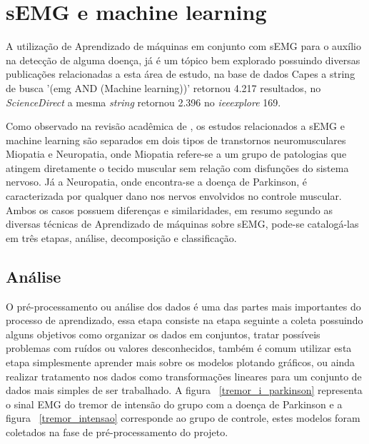 \section{sEMG e machine learning}
A utilização de Aprendizado de máquinas em conjunto com sEMG para o auxílio na detecção de alguma doença, já é um tópico bem explorado possuindo diversas publicações relacionadas a esta área de estudo, na base de dados Capes a string de busca '(emg AND (Machine learning))' retornou 4.217 resultados, no \textit{ScienceDirect} a mesma \textit{string} retornou 2.396 no \textit{ieeexplore} 169.

Como observado na revisão acadêmica de \cite{yousefi2014characterizing}, os estudos relacionados a sEMG e machine learning são separados em  dois tipos de transtornos neuromusculares Miopatia e Neuropatia, onde Miopatia refere-se a um grupo de patologias que atingem diretamente o tecido muscular sem relação com disfunções do sistema nervoso. Já a Neuropatia, onde encontra-se a doença de Parkinson, é caracterizada por qualquer dano nos nervos envolvidos no controle muscular. Ambos os casos possuem diferenças e similaridades, em resumo segundo \cite{yousefi2014characterizing} as diversas técnicas de Aprendizado de máquinas sobre sEMG, pode-se catalogá-las em três etapas, análise, decomposição e classificação.

\subsection{Análise}
O pré-processamento ou análise dos dados é uma das partes mais importantes do processo de aprendizado, essa etapa consiste na etapa seguinte a coleta possuindo alguns objetivos como organizar os dados em conjuntos, tratar possíveis problemas com ruídos ou valores desconhecidos, também é comum utilizar esta etapa simplesmente aprender mais sobre os modelos plotando gráficos, ou ainda realizar tratamento nos dados como transformações lineares para um conjunto de dados mais simples de ser trabalhado. \cite{batista2003pre} A figura ~\ref{tremor_i_parkinson} representa o sinal EMG do tremor de intensão do grupo com a doença de Parkinson e  a figura ~\ref{tremor_intensao} corresponde ao grupo de controle, estes modelos foram coletados na fase de pré-processamento do projeto.



